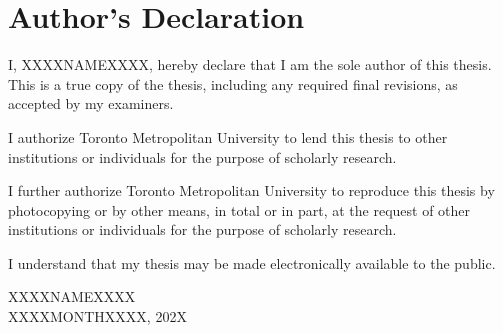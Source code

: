 \pagestyle{plain}
\section*{Author's Declaration}
I, XXXXNAMEXXXX, hereby declare that I am the sole author of this thesis. This is a
true copy of the thesis, including any required final revisions, as accepted by my
examiners.

\noindent I authorize Toronto Metropolitan University to lend this thesis to other institutions or individuals for
the purpose of scholarly research.

\noindent I further authorize Toronto Metropolitan University to reproduce this thesis by photocopying or by
other means, in total or in part, at the request of other institutions or individuals for the
purpose of scholarly research.

\noindent I understand that my thesis may be made electronically available to the public.
\begin{flushright}
XXXXNAMEXXXX \\
XXXXMONTHXXXX, 202X \\
\end{flushright}

